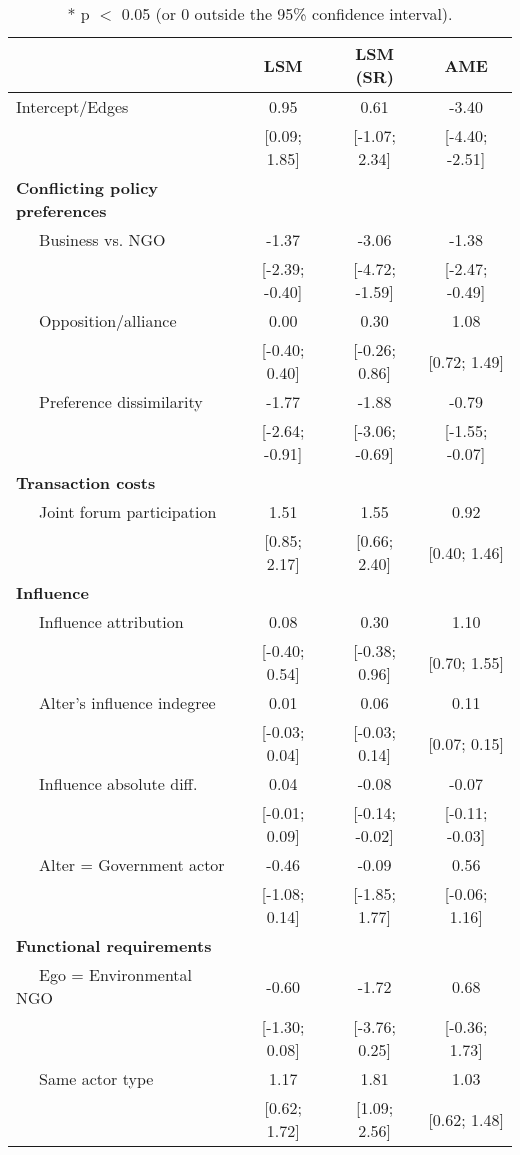 \begin{table}[ht]
\centering
\begingroup\tiny
\begin{tabular}{lccc}
   & LSM & LSM (SR) & AME \\ 
  \hline
\hline
Intercept/Edges & 0.95 & 0.61 & -3.40 \\ 
   & [0.09; 1.85] & [-1.07; 2.34] & [-4.40; -2.51] \\ 
  \textbf{Conflicting policy preferences} &  &  &  \\ 
  $\;\;\;\;$ Business vs. NGO & -1.37 & -3.06 & -1.38 \\ 
   & [-2.39; -0.40] & [-4.72; -1.59] & [-2.47; -0.49] \\ 
  $\;\;\;\;$ Opposition/alliance & 0.00 & 0.30 & 1.08 \\ 
   & [-0.40; 0.40] & [-0.26; 0.86] & [0.72; 1.49] \\ 
  $\;\;\;\;$ Preference dissimilarity & -1.77 & -1.88 & -0.79 \\ 
   & [-2.64; -0.91] & [-3.06; -0.69] & [-1.55; -0.07] \\ 
  \textbf{Transaction costs} &  &  &  \\ 
  $\;\;\;\;$ Joint forum participation & 1.51 & 1.55 & 0.92 \\ 
   & [0.85; 2.17] & [0.66; 2.40] & [0.40; 1.46] \\ 
  \textbf{Influence} &  &  &  \\ 
  $\;\;\;\;$ Influence attribution & 0.08 & 0.30 & 1.10 \\ 
   & [-0.40; 0.54] & [-0.38; 0.96] & [0.70; 1.55] \\ 
  $\;\;\;\;$ Alter's influence indegree & 0.01 & 0.06 & 0.11 \\ 
   & [-0.03; 0.04] & [-0.03; 0.14] & [0.07; 0.15] \\ 
  $\;\;\;\;$ Influence absolute diff. & 0.04 & -0.08 & -0.07 \\ 
   & [-0.01; 0.09] & [-0.14; -0.02] & [-0.11; -0.03] \\ 
  $\;\;\;\;$ Alter = Government actor & -0.46 & -0.09 & 0.56 \\ 
   & [-1.08; 0.14] & [-1.85; 1.77] & [-0.06; 1.16] \\ 
  \textbf{Functional requirements} &  &  &  \\ 
  $\;\;\;\;$ Ego = Environmental NGO & -0.60 & -1.72 & 0.68 \\ 
   & [-1.30; 0.08] & [-3.76; 0.25] & [-0.36; 1.73] \\ 
  $\;\;\;\;$ Same actor type & 1.17 & 1.81 & 1.03 \\ 
   & [0.62; 1.72] & [1.09; 2.56] & [0.62; 1.48] \\ 
   \hline
\hline
\end{tabular}
\endgroup
\caption{* p $<$ 0.05 (or 0 outside the 95\% confidence interval).} 
\label{tab:regTable_latSpace}
\end{table}
